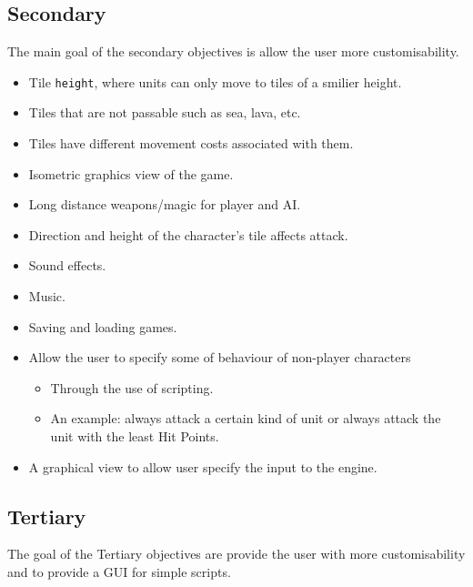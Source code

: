 \subsection{Secondary}
\label{secondary}
The main goal of the secondary objectives is allow the user more customisability. 
\begin{itemize}
	\item Tile \texttt{height}, where units can only move to tiles of a smilier height.
	
	\item Tiles that are not passable such as sea, lava, etc.
	
	\item Tiles have different movement costs associated with them.
	
	\item Isometric graphics view of the game.
	
	\item Long distance weapons\slash magic for player and AI.
	
	\item Direction and height of the character's tile affects attack.
	
	\item Sound effects.
	
	\item Music.
	
	\item Saving and loading games.
	
	\item Allow the user to specify some of behaviour of non-player characters
	\begin{itemize}
		\item Through the use of scripting.
		\item An example: always attack a certain kind of unit or always attack the unit with the least Hit Points.
	\end{itemize}
	
	\item A graphical view to allow user specify the input to the engine.
\end{itemize}

\subsection{Tertiary} 
\label{tertiary}
The goal of the Tertiary objectives are provide the user with more customisability and to provide a GUI for simple scripts. 

